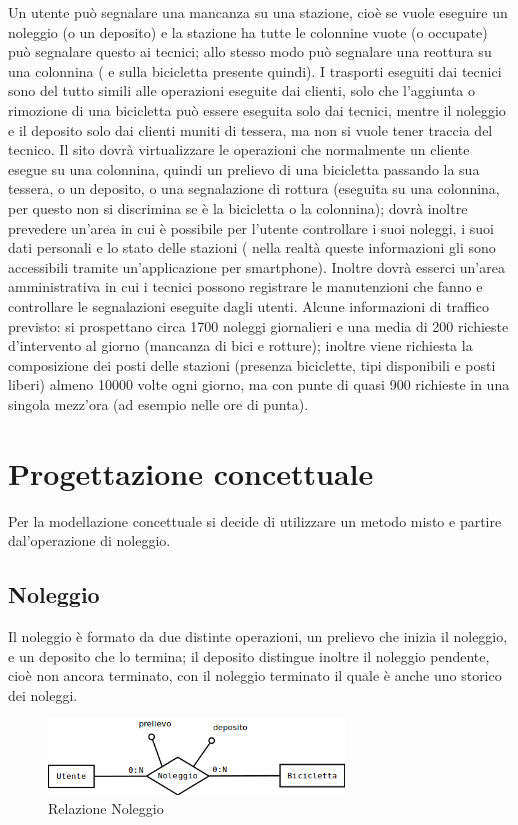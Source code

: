 \documentclass[a4paper,twoside]{article}
\begin{document}
Un utente può segnalare una mancanza su una stazione, cioè se vuole eseguire un noleggio (o un deposito) e la stazione ha tutte le colonnine vuote (o occupate) può segnalare questo ai tecnici; allo stesso modo può segnalare una reottura su una colonnina ( e sulla bicicletta presente quindi).\newline
I trasporti eseguiti dai tecnici sono del tutto simili alle operazioni eseguite dai clienti, solo che l'aggiunta o rimozione di una bicicletta può essere eseguita solo dai tecnici, mentre il noleggio e il deposito solo dai clienti muniti di tessera, ma non si vuole tener traccia del tecnico.\newline
Il sito dovrà virtualizzare le operazioni che normalmente un cliente esegue su una colonnina, quindi un prelievo di una bicicletta passando la sua tessera, o un deposito, o una segnalazione di rottura (eseguita su una colonnina, per questo non si discrimina se è la bicicletta o la colonnina); dovrà inoltre prevedere un'area in cui è possibile per l'utente controllare i suoi noleggi, i suoi dati personali e lo stato delle stazioni ( nella realtà queste informazioni gli sono accessibili tramite un'applicazione per smartphone). Inoltre dovrà esserci un'area amministrativa in cui i tecnici possono registrare le manutenzioni che fanno e controllare le segnalazioni eseguite dagli utenti.\newline
Alcune informazioni di traffico previsto: si prospettano circa 1700 noleggi giornalieri e una media di 200 richieste d'intervento al giorno (mancanza di bici e rotture); inoltre viene richiesta la composizione dei posti delle stazioni (presenza biciclette, tipi disponibili e posti liberi) almeno 10000 volte ogni giorno, ma con punte di quasi 900 richieste in una singola mezz'ora (ad esempio nelle ore di punta).
\section{Progettazione concettuale}
Per la modellazione concettuale si decide di utilizzare un metodo misto e partire dal'operazione di noleggio.
\subsection{Noleggio}
Il noleggio è formato da due distinte operazioni, un prelievo che inizia il noleggio, e un deposito che lo termina; il deposito distingue inoltre il noleggio pendente, cioè non ancora terminato, con il noleggio terminato il quale è anche uno storico dei noleggi.
\begin{figure}[h]
 \centering
 \includegraphics[width=0.7\textwidth]{Concettuale01}
\caption{Relazione Noleggio}
\end{figure}
\end{document}
